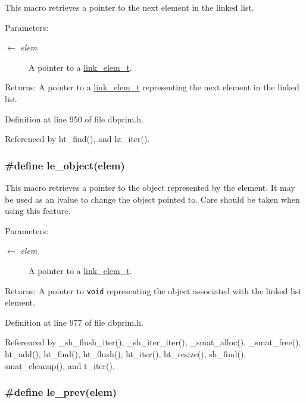 This macro retrieves a pointer to the next element in the linked list.

\begin{Desc}
\item[Parameters:]
\begin{description}
\item[\mbox{$\leftarrow$} {\em elem}]A pointer to a \hyperlink{group__dbprim__link_ga1}{link\_\-elem\_\-t}.\end{description}
\end{Desc}
\begin{Desc}
\item[Returns:]A pointer to a \hyperlink{group__dbprim__link_ga1}{link\_\-elem\_\-t} representing the next element in the linked list.\end{Desc}


Definition at line 950 of file dbprim.h.

Referenced by ht\_\-find(), and ht\_\-iter().\hypertarget{group__dbprim__link_ga25}{
\subsubsection[le\_\-object]{\setlength{\rightskip}{0pt plus 5cm}\#define le\_\-object(elem)}}
\label{group__dbprim__link_ga25}


This macro retrieves a pointer to the object represented by the element. It may be used as an lvalue to change the object pointed to. Care should be taken when using this feature.

\begin{Desc}
\item[Parameters:]
\begin{description}
\item[\mbox{$\leftarrow$} {\em elem}]A pointer to a \hyperlink{group__dbprim__link_ga1}{link\_\-elem\_\-t}.\end{description}
\end{Desc}
\begin{Desc}
\item[Returns:]A pointer to {\tt void} representing the object associated with the linked list element.\end{Desc}


Definition at line 977 of file dbprim.h.

Referenced by \_\-sh\_\-flush\_\-iter(), \_\-sh\_\-iter\_\-iter(), \_\-smat\_\-alloc(), \_\-smat\_\-free(), ht\_\-add(), ht\_\-find(), ht\_\-flush(), ht\_\-iter(), ht\_\-resize(), sh\_\-find(), smat\_\-cleanup(), and t\_\-iter().\hypertarget{group__dbprim__link_ga24}{
\subsubsection[le\_\-prev]{\setlength{\rightskip}{0pt plus 5cm}\#define le\_\-prev(elem)}}
\label{group__dbprim__link_ga24}


